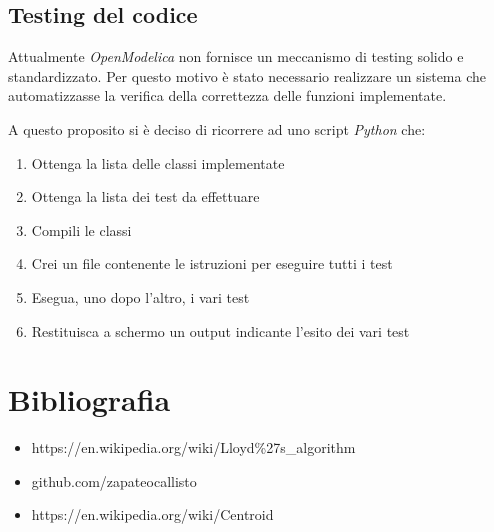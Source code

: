 \documentclass[10pt,a4paper]{article}
\newcommand{\modelicaclass}[1]{

}
\begin{document}

\modelicaclass{TargetPos.mo}

\subsection{Testing del codice}

Attualmente \textit{OpenModelica} non fornisce un meccanismo di testing solido e standardizzato. Per questo motivo è stato necessario realizzare un sistema che automatizzasse la verifica della correttezza delle funzioni implementate.

A questo proposito si è deciso di ricorrere ad uno script \textit{Python} che:

\begin{enumerate}
	\item Ottenga la lista delle classi implementate
	\item Ottenga la lista dei test da effettuare
	\item Compili le classi
	\item Crei un file contenente le istruzioni per eseguire tutti i test
	\item Esegua, uno dopo l'altro, i vari test
	\item Restituisca a schermo un output indicante l'esito dei vari test
\end{enumerate}



\pagebreak

\section*{Bibliografia}

\begin{itemize}
	\item https://en.wikipedia.org/wiki/Lloyd\%27s\_algorithm
	\item github.com/zapateocallisto
	\item https://en.wikipedia.org/wiki/Centroid
\end{itemize}
\end{document}

